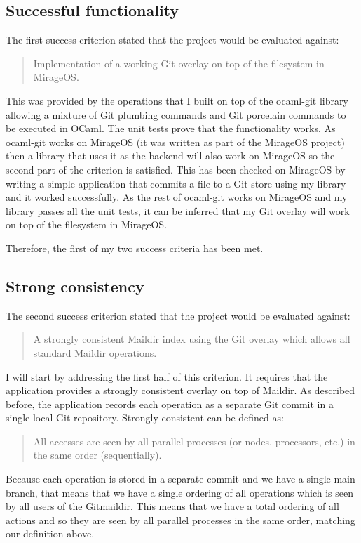 \subsection{Successful functionality}

The first success criterion stated that the project would be evaluated against:

\begin{quote}
  Implementation of a working Git overlay on top of the filesystem in MirageOS.
\end{quote}

This was provided by the operations that I built on top of the ocaml-git library allowing a mixture of Git plumbing commands and Git porcelain commands to be executed in OCaml. The unit tests prove that the functionality works. As ocaml-git works on MirageOS (it was written as part of the MirageOS project) then a library that uses it as the backend will also work on MirageOS so the second part of the criterion is satisfied. This has been checked on MirageOS by writing a simple application that commits a file to a Git store using my library and it worked successfully. As the rest of ocaml-git works on MirageOS and my library passes all the unit tests, it can be inferred that my Git overlay will work on top of the filesystem in MirageOS.

Therefore, the first of my two success criteria has been met.

\subsection{Strong consistency}

The second success criterion stated that the project would be evaluated against:

\begin{quote}
  A strongly consistent Maildir index using the Git overlay which allows all standard Maildir operations.
\end{quote}

I will start by addressing the first half of this criterion. It requires that the application provides a strongly consistent overlay on top of Maildir. As described before, the application records each operation as a separate Git commit in a single local Git repository. Strongly consistent can be defined as:
\begin{quote}
  All accesses are seen by all parallel processes (or nodes, processors, etc.) in the same order (sequentially).
\end{quote}
Because each operation is stored in a separate commit and we have a single main branch, that means that we have a single ordering of all operations which is seen by all users of the Gitmaildir. This means that we have a total ordering of all actions and so they are seen by all parallel processes in the same order, matching our definition above.

